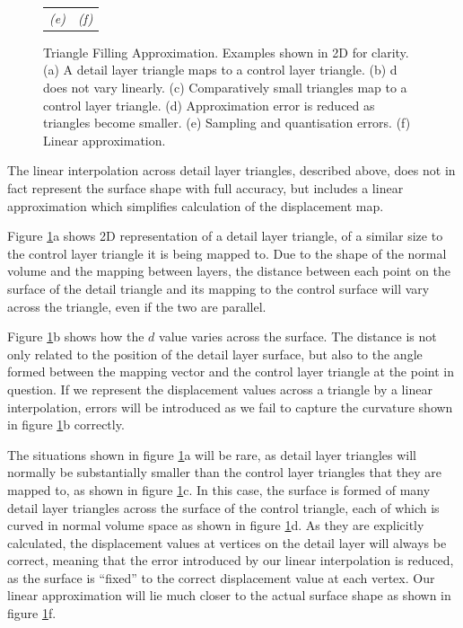 \begin{figure}
\begin{center}
\begin{tabular}{cc}
{\it (e)} & {\it (f)}
\end{tabular}
\caption[Triangle Filling Approximation]{\label{fig:approximation} Triangle Filling Approximation. Examples shown in 2D for clarity. (a) A detail layer triangle maps to a control layer triangle. (b) d does not vary linearly. (c) Comparatively small triangles map to a control layer triangle. (d) Approximation error is reduced as triangles become smaller. (e) Sampling and quantisation errors. (f) Linear approximation. }
\end{center}
\end{figure}

The linear interpolation across detail layer triangles, described above, does not in fact represent the surface shape with full accuracy, but includes a linear approximation which simplifies calculation of the displacement map.

Figure \ref{fig:approximation}a shows 2D representation of a detail layer triangle, of a similar size to the control layer triangle it is being mapped to. Due to the shape of the normal volume and the mapping between layers, the distance between each point on the surface of the detail triangle and its mapping to the control surface will vary across the triangle, even if the two are parallel. 

Figure \ref{fig:approximation}b shows how the $d$ value varies across the surface. The distance is not only related to the position of the detail layer surface, but also to the angle formed between the mapping vector and the control layer triangle at the point in question. If we represent the displacement values across a triangle by a linear interpolation, errors will be introduced as we fail to capture the curvature shown in figure \ref{fig:approximation}b correctly.

The situations shown in figure \ref{fig:approximation}a will be rare, as detail layer triangles will normally be substantially smaller than the control layer triangles that they are mapped to, as shown in figure \ref{fig:approximation}c. In this case, the surface is formed of many detail layer triangles across the surface of the control triangle, each of which is curved in normal volume space as shown in figure \ref{fig:approximation}d. As they are explicitly calculated, the displacement values at vertices on the detail layer will always be correct, meaning that the error introduced by our linear interpolation is reduced, as the surface is ``fixed'' to the correct displacement value at each vertex. Our linear approximation will lie much closer to the actual surface shape as shown in figure \ref{fig:approximation}f.

